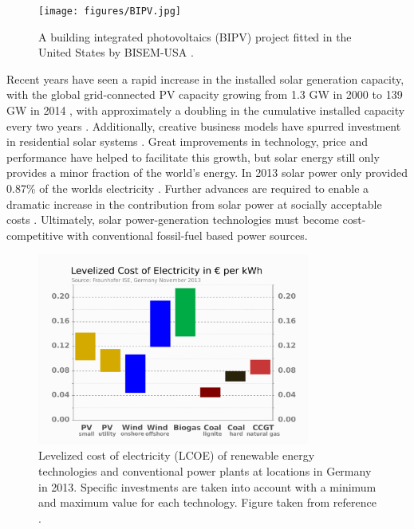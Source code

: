 \begin{figure}[h!]
  \centering
    \texttt{[image: figures/BIPV.jpg]}
    \caption{A building integrated photovoltaics (BIPV) project fitted in the United States by BISEM-USA \cite{BIPV}.}
  \label{BIPV}
\end{figure}

Recent years have seen a rapid increase in the installed solar generation capacity, with the global grid-connected PV capacity growing from 1.3 GW in 2000 to 139 GW in 2014 \cite{pathways_129}, with approximately a doubling in the cumulative installed capacity every two years \cite{pathways}. Additionally, creative business models have spurred investment in residential solar systems \cite{MIT}. Great improvements in technology, price and performance have helped to facilitate this growth, but solar energy still only provides a minor fraction of the world's energy. In 2013 solar power only provided 0.87\% of the worlds electricity \cite{pathways_130}. Further advances are required to enable a dramatic increase in the contribution from solar power at socially acceptable costs \cite{MIT}. Ultimately, solar power-generation technologies must become cost-competitive with conventional fossil-fuel based power sources.

\begin{figure}[h!]
  \centering
    \includegraphics[width=0.8\textwidth]{figures/LCOE.png}
    \caption{Levelized cost of electricity (LCOE) of renewable energy technologies and conventional power plants at locations in Germany in 2013.  Specific investments are taken into account with a minimum and maximum value for each technology. Figure taken from reference .}
  \label{LCOE}
\end{figure}

